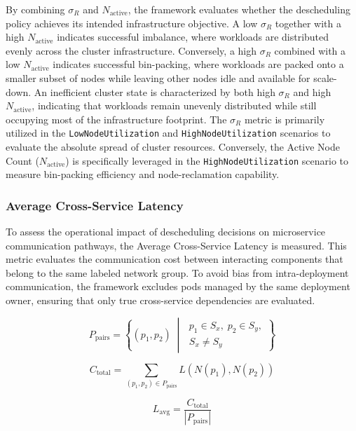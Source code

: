 By combining \(\sigma_R\) and \(N_{\text{active}}\), the framework evaluates whether the descheduling policy achieves its intended infrastructure objective. A low \(\sigma_R\) together with a high \(N_{\text{active}}\) indicates successful imbalance, where workloads are distributed evenly across the cluster infrastructure. Conversely, a high \(\sigma_R\) combined with a low \(N_{\text{active}}\) indicates successful bin-packing, where workloads are packed onto a smaller subset of nodes while leaving other nodes idle and available for scale-down. An inefficient cluster state is characterized by both high \(\sigma_R\) and high \(N_{\text{active}}\), indicating that workloads remain unevenly distributed while still occupying most of the infrastructure footprint. The \(\sigma_R\) metric is primarily utilized in the \texttt{LowNodeUtilization} and \texttt{HighNodeUtilization} scenarios to evaluate the absolute spread of cluster resources. Conversely, the Active Node Count (\(N_{\text{active}}\)) is specifically leveraged in the \texttt{HighNodeUtilization} scenario to measure bin-packing efficiency and node-reclamation capability.


\subsubsection{Average Cross-Service Latency}
\label{subsubsec:netaware4_evaluationmetrics3}

To assess the operational impact of descheduling decisions on microservice communication pathways, the Average Cross-Service Latency is measured. This metric evaluates the communication cost between interacting components that belong to the same labeled network group. To avoid bias from intra-deployment communication, the framework excludes pods managed by the same deployment owner, ensuring that only true cross-service dependencies are evaluated.

\[
P_{\text{pairs}}
=
\left\{
(p_1, p_2)
\;\middle|\;
\begin{array}{l}
p_1 \in S_x,\; p_2 \in S_y,\\
S_x \neq S_y
\end{array}
\right\}
\]

\[
C_{\text{total}}
=
\sum_{(p_1, p_2) \in P_{\text{pairs}}}
L\left(
N(p_1),
N(p_2)
\right)
\]

\[
L_{\text{avg}}
=
\frac{C_{\text{total}}}
{|P_{\text{pairs}}|}
\]

